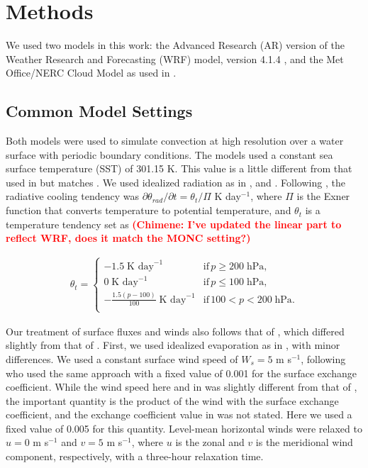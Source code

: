 \documentclass[draft]{agujournal2019}
\newcommand{\todo}[1]{\textcolor{red}{\textbf{(#1)}}}
\begin{document}
\section{Methods}
\label{sec:methods}

We used two models in this work: the Advanced Research (AR) version of the
Weather Research and Forecasting (WRF) model, version 4.1.4
\cite{Skamarock_2019}, and the Met Office/NERC Cloud Model
\cite<MONC,>{Brown_2020} as used in .

\subsection{Common Model Settings}

Both models were used to simulate convection at high resolution over a water
surface with periodic boundary conditions. The models used a constant sea
surface temperature (SST) of 301.15 K. This value is a little different from
that used in  but matches . We
used idealized radiation as in , 
and . Following , the radiative
cooling tendency was $\partial \theta_{rad} / \partial t = \theta_t/\Pi$ K
day$^{-1}$, where $\Pi$ is the Exner function that converts temperature to
potential temperature, and $\theta_t$ is a temperature tendency set as
\todo{Chimene: I've updated the linear part to reflect WRF, does it match the
MONC setting?}

\begin{align}
 \theta_t = \begin{cases}
    -1.5\; \textrm{K day}^{-1} & \textrm{if}\, p \geq 200\; \textrm{hPa}, \\
    0\; \textrm{K day}^{-1} & \textrm{if}\, p \leq 100\; \textrm{hPa}, \\
    -\frac{1.5 (p-100)}{100}\; \textrm{K day}^{-1} & \textrm{if}\, 100 < p < 200\; \textrm{hPa}. \\
 \end{cases}
\end{align}

Our treatment of surface fluxes and winds also follows that of
, which differed slightly from that of
. First, we used idealized evaporation as in
, with minor differences. We used a constant surface wind
speed of $W_s = 5$ m s$^{-1}$, following  who used the
same approach with a fixed value of 0.001 for the surface exchange coefficient.
While the wind speed here and in  was slightly different
from that of , the important quantity is the product of
the wind with the surface exchange coefficient, and the exchange coefficient
value in  was not stated. Here we used a fixed value of
0.005 for this quantity. Level-mean horizontal winds were relaxed to $u = 0$ m
s$^{-1}$ and $v = 5$ m s$^{-1}$, where $u$ is the zonal and $v$ is the
meridional wind component, respectively, with a three-hour relaxation time.
\end{document}
